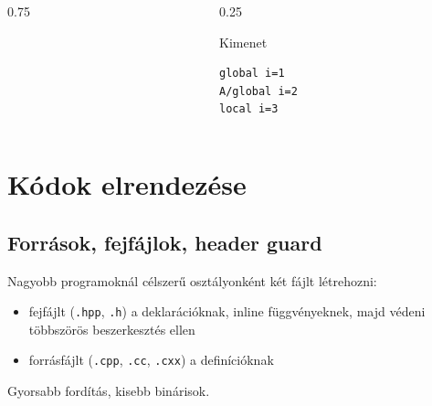 \documentclass[usenames,dvipsnames,aspectratio=169]{beamer}
\begin{document}
\begin{frame}[fragile]
    \begin{columns}
        \begin{column}{0.75\textwidth}
            \begin{exampleblock}{}
                \scriptsize
                
            \end{exampleblock}
        \end{column}
        \begin{column}{0.25\textwidth}
            \begin{block}{Kimenet}
                \begin{verbatim}
global i=1
A/global i=2
local i=3
\end{verbatim}
            \end{block}
        \end{column}
    \end{columns}
\end{frame}

\section{Kódok elrendezése}

\subsection{Források, fejfájlok, header guard}

\begin{frame}
    Nagyobb programoknál célszerű osztályonként két fájlt létrehozni:
    \begin{itemize}
        \item fejfájlt (\texttt{.hpp}, \texttt{.h}) a deklarációknak, inline függvényeknek, majd védeni többszörös beszerkesztés ellen
        \item forrásfájlt (\texttt{.cpp}, \texttt{.cc}, \texttt{.cxx}) a definícióknak
    \end{itemize}
    Gyorsabb fordítás, kisebb binárisok.
    \begin{exampleblock}{}
        \footnotesize
        
    \end{exampleblock}
\end{frame}
\end{document}
